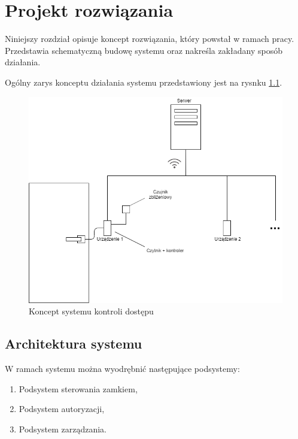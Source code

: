 \chapter{Projekt rozwiązania}
\label{chap:hl-arch}

        Niniejszy rozdział opisuje koncept rozwiązania, który powstał w ramach pracy. Przedstawia schematyczną budowę systemu oraz nakreśla zakładany sposób działania.

        Ogólny zarys konceptu działania systemu przedstawiony jest na rysnku \ref{fig:door}.

        \begin{figure}[]
                \includegraphics[width=\linewidth]{chapters/images/door2.png}
                \caption{Koncept systemu kontroli dostępu}
                \label{fig:door}
        \end{figure}

        \section{Architektura systemu}
                W ramach systemu można wyodrębnić następujące podsystemy:
                \begin{enumerate}
                        \item Podsystem sterowania zamkiem,
                        \item Podsystem autoryzacji,
                        \item Podsystem zarządzania.
                \end{enumerate}

